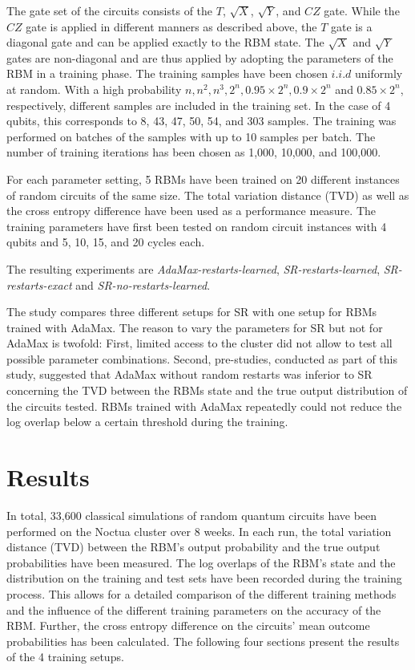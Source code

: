 The gate set of the circuits consists of the $T$, $\sqrt{X}$, $\sqrt{Y}$, and $CZ$ gate. While the $CZ$ gate is 
applied in different manners as described above, the $T$ gate is a diagonal gate and can be applied exactly to the RBM state.
The $\sqrt{X}$ and $\sqrt{Y}$ gates are non-diagonal and are thus applied by adopting the parameters of the RBM in 
a training phase. The training samples have been chosen $i.i.d$ uniformly at random. 
With a high probability $n, n^2, n^3, 2^n, 0.95 \times 2^n, 0.9 \times 2^n$ and $0.85 \times 2^n$,
respectively, different samples are included in the training set. In the case of 4 qubits, this corresponds to 
8, 43, 47, 50, 54, and 303 samples. The training was performed on batches of the samples with 
up to 10 samples per batch.
The number of training iterations has been chosen as 1,000, 10,000, and 100,000. 

For each parameter setting, 5 RBMs have been trained on 20 different instances of random circuits of the same 
size. The total variation distance (TVD) as well as the cross entropy difference have been used as a performance measure.
The training parameters have first been tested on random circuit instances with 4 qubits and 
5, 10, 15, and 20 cycles each. 

The resulting experiments are \textit{AdaMax-restarts-learned}, \textit{SR-restarts-learned}, 
\textit{SR-restarts-exact} and \textit{SR-no-restarts-learned}. 

The study compares three different setups for SR with one setup for RBMs trained with 
AdaMax. The reason to vary the parameters for SR but not for AdaMax is twofold:
First, limited access to the cluster did not allow to test all possible parameter combinations. Second,
pre-studies, conducted as part of this study, suggested that AdaMax without random restarts 
was inferior to SR concerning the TVD between the RBMs state and the true output distribution of the 
circuits tested. RBMs trained with AdaMax repeatedly could not reduce the 
log overlap below a certain threshold during the training.

\section{Results}
\label{sec:results}

In total, 33,600 classical simulations of random quantum circuits have been performed 
on the Noctua cluster over 8 weeks. In each run, the total variation distance (TVD)
between the RBM's output probability and the true output probabilities have been measured.
 The log overlaps of the RBM's state and the distribution on the training and test sets have been recorded during the training process. This allows for a detailed comparison
of the different training methods and the influence of the different training parameters on the 
accuracy of the RBM. Further, the cross entropy difference on the circuits' mean outcome probabilities
has been calculated. The following four sections present the results of the 4 training setups.


